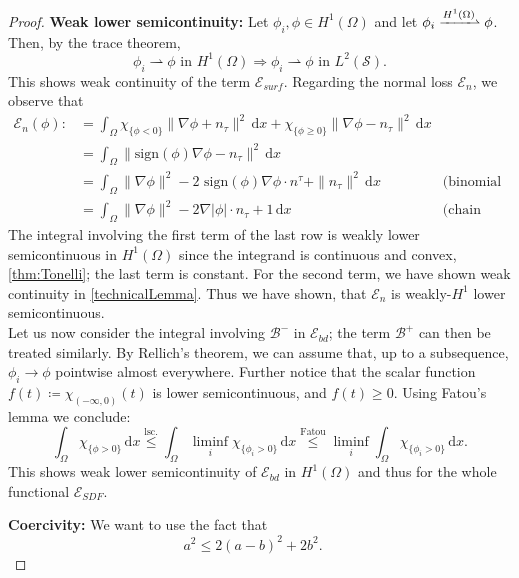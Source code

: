 \documentclass[12pt,openany]{book}
\def\S{\mathcal{S}}
\theoremstyle{plainnormal}
\theoremstyle{remark}
\begin{document}
\begin{proof}\textbf{Weak lower semicontinuity:}
Let $\phi_i, \phi \in H^1(\Omega)$ and let $\phi_i \xrightharpoonup{H^1(\Omega)}\phi$. Then, by the trace theorem, $$\phi_i \rightharpoonup\phi \text{ in }H^1(\Omega) \Rightarrow \phi_i \rightharpoonup\phi \text{ in }L^2(\S).$$
This shows weak continuity of the term $\mathcal{E}_{surf}$. Regarding the normal loss $\mathcal{E}_n$, we observe that \begin{align*}
    \mathcal{E}_n(\phi) :&= \int_\Omega \chi_{\{\phi < 0\}} \|\nabla \phi + n_\tau\|^2 \,\mathrm{d}x + \chi_{\{\phi \geq 0\}} \|\nabla \phi - n_\tau\|^2 \,\mathrm{d}x\\&= \int_\Omega \|\text{sign}(\phi) \nabla \phi - n_\tau\|^ 2\,\mathrm{d}x\\
    & =\int_\Omega \|\nabla \phi\|^2  -2 \text{ sign} (\phi) \nabla \phi \cdot n^\tau  + \|n_\tau\|^2 \,\mathrm{d}x \quad &\text{(binomial theorem)}\\
    &= \int_\Omega \|\nabla \phi\|^2  -2 \nabla |\phi| \cdot n_\tau  + 1 \,\mathrm{d}x &\text{(chain rule)}
\end{align*}
The integral involving the first term of the last row is weakly lower semicontinuous in $H^1(\Omega)$ since the integrand is continuous and convex, \cref{thm:Tonelli}; the last term is constant. For the second term, we have shown weak continuity in \cref{technicalLemma}. Thus we have shown, that $\mathcal{E}_n$ is weakly-$H^1$ lower semicontinuous.\\
Let us now consider the integral involving $\mathcal{B}^-$ in $\mathcal E_{bd}$; the term $\mathcal B^+$ can then be treated similarly. By Rellich's theorem, we can assume that, up to a subsequence, $\phi_i \rightarrow\phi$ pointwise almost everywhere. Further notice that the scalar function $f(t) \coloneqq \chi_{(-\infty, 0)}(t)$ is lower semicontinuous, and $f(t) \geq 0$. Using Fatou's lemma we conclude: $$\int_\Omega  \chi_{\{\phi > 0\}}  \,\mathrm{d}x \overset{\text{lsc.}}{\leq} \int_\Omega \liminf_i  \chi_{\{\phi_i > 0\}}  \,\mathrm{d}x \overset{\text{Fatou}}{\leq} \liminf_i\int_\Omega  \chi_{\{\phi_i > 0\}}  \,\mathrm{d}x.$$ This shows weak lower semicontinuity of $\mathcal{E}_{bd}$ in $H^1(\Omega)$ and thus for the whole functional $\mathcal{E}_{SDF}.$\par
\textbf{Coercivity:} We want to use the fact that 
\begin{equation}\label{eq:star_ineq_coerc}
    a^2 \leq 2(a-b)^2 + 2b^2. \quad \tag{$\star$}
\end{equation}

\end{proof}
\end{document}
